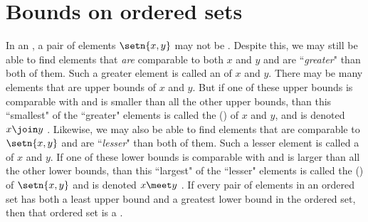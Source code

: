 

\section{Bounds on ordered sets}
In an  , a pair of elements $\setn{x,y}$ may not be .
Despite this, we may still be able to find elements that {\em are}
comparable to both $x$ and $y$ and are ``{\em greater}" than both of them.
Such a greater element is called an  of $x$ and $y$.
There may be many elements that are upper bounds of $x$ and $y$.
But if one of these upper bounds is comparable with and is smaller than all the other upper bounds,
than this ``smallest" of the ``greater" elements is called the
 () of $x$ and $y$, and is denoted $x \join y$ .
Likewise, we may also be able to find elements that are
comparable to $\setn{x,y}$ and are ``{\em lesser}" than both of them.
Such a lesser element is called a  of $x$ and $y$.
If one of these lower bounds is comparable with and is larger than all the other lower bounds,
than this ``largest" of the ``lesser" elements is called the
 () of $\setn{x,y}$ and is denoted $x \meet y$ .
If every pair of elements in an ordered set has both a least upper bound and a greatest lower bound in the ordered set,
then that ordered set is a  .

